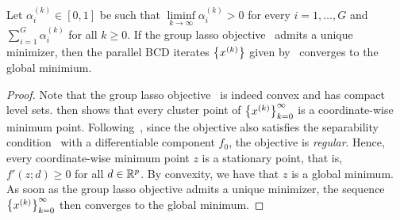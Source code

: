 \begin{corollary}
\label{cor:parallel-bcd}
Let $\alpha_i^{(k)} \in [0,1]$ be such that $\liminf\limits_{k\to\infty} \alpha_i^{(k)} > 0$
for every $i=1,\ldots, G$ and $\sum\limits_{i=1}^G \alpha_i^{(k)}$ for all $k\geq 0$.
If the group lasso objective~
admits a unique minimizer, then the parallel BCD iterates $\left\{x^{(k)}\right\}$ 
given by~
converges to the global minimium.
\end{corollary}
\begin{proof}

Note that the group lasso objective~
is indeed convex and has compact level sets.
 then shows that every cluster point of $\left\{x^{(k)}\right\}_{k=0}^\infty$
is a coordinate-wise minimum point.
Following~\citet[Lemma 3.1]{tseng:2001}, since the objective also 
satisfies the separability condition~
with a differentiable component $f_0$, the objective is \emph{regular}.
Hence, every coordinate-wise minimum point $z$ is a stationary point,
that is, $f'(z; d) \geq 0$ for all $d \in \mathbb{R}^p$.
By convexity, we have that $z$ is a global minimum.
As soon as the group lasso objective admits a unique minimizer,
the sequence $\left\{x^{(k)}\right\}_{k=0}^\infty$ then
converges to the global minimum.

\end{proof}
